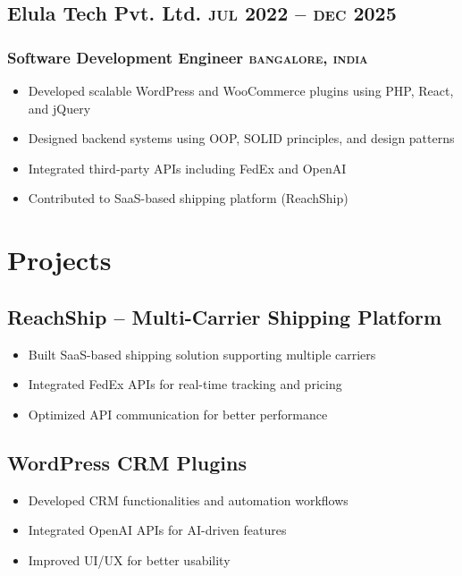 \documentclass{article}
\newcommand{\rside}[1]{\hfill \normalfont\scshape\MakeLowercase{#1}}
\begin{document}
\subsection{Elula Tech Pvt. Ltd. \rside{Jul 2022 -- Dec 2025}}
\subsubsection{Software Development Engineer \rside{Bangalore, India}}
\begin{itemize}
\item Developed scalable WordPress and WooCommerce plugins using PHP, React, and jQuery
\item Designed backend systems using OOP, SOLID principles, and design patterns
\item Integrated third-party APIs including FedEx and OpenAI
\item Contributed to SaaS-based shipping platform (ReachShip)
\end{itemize}

\section{\faFlask\enspace Projects}

\subsection{ReachShip – Multi-Carrier Shipping Platform}
\begin{itemize}
\item Built SaaS-based shipping solution supporting multiple carriers
\item Integrated FedEx APIs for real-time tracking and pricing
\item Optimized API communication for better performance
\end{itemize}

\subsection{WordPress CRM Plugins}
\begin{itemize}
\item Developed CRM functionalities and automation workflows
\item Integrated OpenAI APIs for AI-driven features
\item Improved UI/UX for better usability
\end{itemize}
\end{document}
